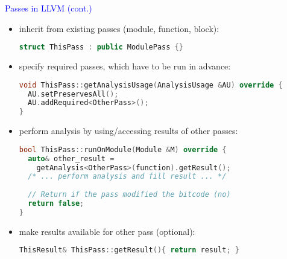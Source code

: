 \begin{frame}[fragile]{\textcolor{blue}{Passes in LLVM (cont.)}}
\underline{}
\begin{itemize}
\item inherit from existing passes (module, function, block):
\begin{footnotesize}
\begin{lstlisting}[language=C++]
struct ThisPass : public ModulePass {}
\end{lstlisting}
\end{footnotesize}

\item specify required passes, which have to be run in advance:
\begin{footnotesize}
\begin{lstlisting}[language=C++]
void ThisPass::getAnalysisUsage(AnalysisUsage &AU) override {
  AU.setPreservesAll();
  AU.addRequired<OtherPass>();
}
\end{lstlisting}
\end{footnotesize}

\item perform analysis by using/accessing results of other passes:
\begin{footnotesize}
\begin{lstlisting}[language=C++]
bool ThisPass::runOnModule(Module &M) override {
  auto& other_result =  
    getAnalysis<OtherPass>(function).getResult();
  /* ... perform analysis and fill result ... */
  
  // Return if the pass modified the bitcode (no)
  return false;
}
\end{lstlisting}
\end{footnotesize}

\item make results available for other pass (optional): 
\begin{footnotesize}
\begin{lstlisting}[language=C++]  
ThisResult& ThisPass::getResult(){ return result; }
\end{lstlisting}
\end{footnotesize}

\end{itemize}

\end{frame}
%



